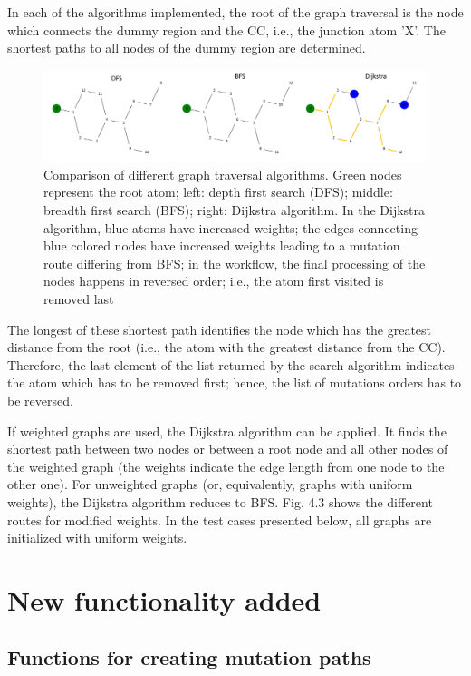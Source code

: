 In each of the algorithms implemented, the root of the graph traversal is the node which connects the dummy region and the CC, i.e., the junction atom 'X'.
The shortest paths to all nodes of the dummy region are determined.

\begin{figure}

\includegraphics[scale=0.455]{dfs_bfs_dijkstra_comp1_v3.png}\caption{Comparison of different graph traversal algorithms. Green nodes represent the root atom; left: depth first
search (DFS); middle: breadth first search (BFS); right: Dijkstra algorithm. In the Dijkstra algorithm, blue atoms have increased weights;  the
edges connecting blue colored nodes have increased weights leading
to a mutation route differing from BFS; in the \trafo workflow, the final processing of the
nodes happens in reversed order; i.e., the atom first visited is removed last}

\end{figure}

The longest of these shortest path identifies the node which has the greatest
distance from the root (i.e., the atom with the greatest distance from
the CC). Therefore, the last element of the list returned by the search algorithm indicates the atom which has to be removed first; hence, the list of mutations orders has to be reversed.

If weighted graphs are used, the Dijkstra algorithm can be applied.
It finds the shortest path between two nodes or between a root node
and all other nodes of the weighted graph (the weights indicate the
edge length from one node to the other one). For unweighted graphs
(or, equivalently, graphs with uniform weights), the Dijkstra algorithm
reduces to BFS. Fig. 4.3 shows the different routes for modified weights.
In the test cases presented below, all graphs are initialized with uniform weights.

\section{New functionality added}

\subsection{Functions for creating mutation paths}

